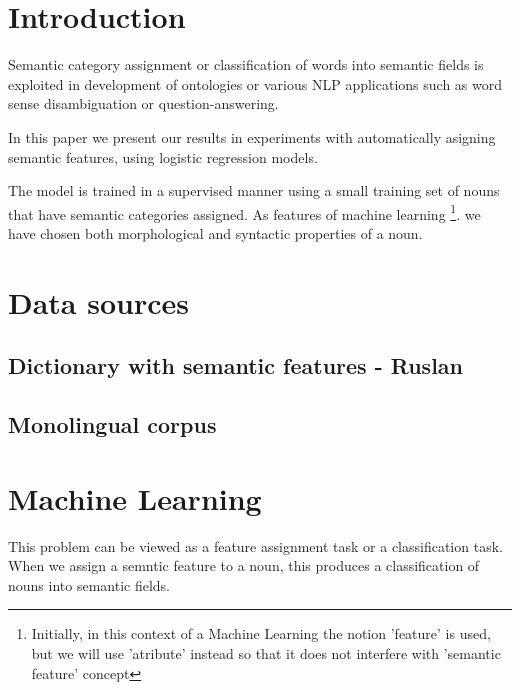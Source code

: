 \documentclass[letterpaper]{article}
\begin{document}
%
\title{}
\maketitle
\begin{abstract}
\begin{quote}
\end{quote}
\end{abstract}


\section{Introduction}
Semantic category assignment or classification of words into semantic fields 
is exploited in development of ontologies or various NLP applications such as 
word sense disambiguation or question-answering.

In this paper we present our results in experiments with automatically asigning semantic features,
using logistic regression models.

The model is trained in a supervised manner
using a small training set of nouns that have semantic categories assigned. 
As features of machine learning \footnote{Initially, in this context of a Machine Learning the notion 'feature'
is used, but we will use 'atribute' instead so that it does not interfere with 'semantic feature' concept}.
we have chosen both morphological and syntactic properties of a noun.


\section{Data sources}

\subsection{Dictionary with semantic features - Ruslan}
\subsection{Monolingual corpus}


\section{Machine Learning}

This problem can be viewed as a feature assignment task or a 
classification task. %
When we assign a semntic feature to a noun, this produces a classification
of nouns into semantic fields.
\end{document}
